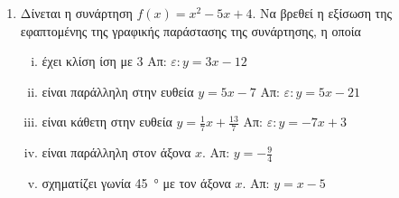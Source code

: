 \documentclass[a4paper,table]{report}
\begin{document}
\begin{enumerate}
    \item Δίνεται η συνάρτηση $ f(x) = x^{2}-5x+4 $. Να βρεθεί η εξίσωση της 
      εφαπτομένης της γραφικής παράστασης της συνάρτησης, η οποία 
      \begin{enumerate}[i)]
        \item έχει κλίση ίση με 3 \hfill Απ: $ \varepsilon: y=3x-12 $ 
        \item είναι παράλληλη στην ευθεία $ y=5x-7 $ \hfill Απ: $ \varepsilon: y=5x-21 $ 
        \item είναι κάθετη στην ευθεία $ y= \frac{1}{7} x + \frac{13}{7} $
          \hfill Απ: $ \varepsilon: y=-7x+3 $ 
        \item είναι παράλληλη στον άξονα $x$. \hfill Απ: $ y=- \frac{9}{4} $ 
        \item σχηματίζει γωνία \SI{45}{\degree} με τον άξονα $x$. 
          \hfill Απ: $ y=x-5
          $  
      \end{enumerate}




\end{enumerate}
\end{document}
